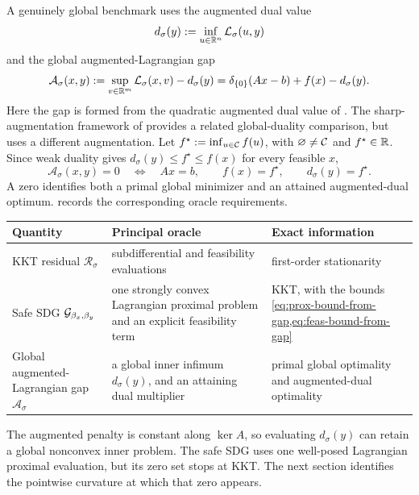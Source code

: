 A genuinely global benchmark uses the augmented dual value
\begin{equation}
  d_\sigma(y):=\inf_{u\in\mathbb{R}^n}\mathcal{L}_\sigma(u,y)
  \label{eq:augmented-dual-value}
\end{equation}
and the global augmented-Lagrangian gap
\begin{equation}
  \mathcal A_\sigma(x,y)
  :=
  \sup_{v\in\mathbb{R}^m}\mathcal{L}_\sigma(x,v)-d_\sigma(y)
  =
  \delta_{\{0\}}(Ax-b)+f(x)-d_\sigma(y).
  \label{eq:global-al-gap}
\end{equation}
Here the gap is formed from the quadratic augmented dual value of
\citet{Rockafellar1974}.  The sharp-augmentation framework of
\citet{YalcinKasimbeyli2020} provides a related global-duality comparison,
but uses a different augmentation.  Let
\(f^\star:=\inf_{u\in\mathcal{C}}f(u)\), with
\(\varnothing\ne\mathcal{C}\) and \(f^\star\in\mathbb{R}\).  Since weak duality gives
\(d_\sigma(y)\le f^\star\le f(x)\) for every feasible \(x\),
\begin{equation}
  \mathcal A_\sigma(x,y)=0
  \quad\Longleftrightarrow\quad
  Ax=b,\qquad f(x)=f^\star,\qquad d_\sigma(y)=f^\star .
  \label{eq:global-al-zero}
\end{equation}
A zero identifies both a primal global minimizer and an attained
augmented-dual optimum.   records the
corresponding oracle requirements.

\begin{center}
  \captionsetup{hypcap=false}
  \centering
  \label{tab:certificate-comparison}
  \small
  \begin{tabularx}{\textwidth}{@{}
    >{\raggedright\arraybackslash}p{}
    >{\raggedright\arraybackslash}X
    >{\raggedright\arraybackslash}X@{}}
    \toprule
    Quantity & Principal oracle & Exact information\\
    \midrule
    KKT residual \(\mathcal R_\sigma\)
      & subdifferential and feasibility evaluations
      & first-order stationarity\\
    Safe SDG \(\mathcal{G}_{\beta_x,\beta_y}\)
      & one strongly convex Lagrangian proximal problem and an explicit
        feasibility term
      & KKT, with the bounds
        \cref{eq:prox-bound-from-gap,eq:feas-bound-from-gap}\\
    Global augmented-Lagrangian gap \(\mathcal A_\sigma\)
      & a global inner infimum \(d_\sigma(y)\), and an attaining dual multiplier
      & primal global optimality and augmented-dual optimality\\
    \bottomrule
  \end{tabularx}
\end{center}

The augmented penalty is constant along \(\ker A\), so evaluating
\(d_\sigma(y)\) can retain a global nonconvex inner problem.  The safe SDG
uses one well-posed Lagrangian proximal evaluation, but its zero set stops at
KKT.  The next section identifies the pointwise curvature at which that zero
appears.
